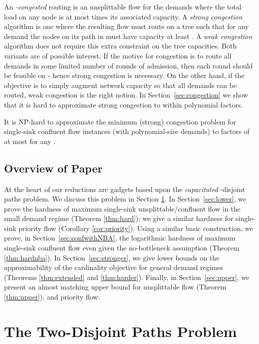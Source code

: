 \documentclass[12pt]{article}
\begin{document}
An  {\em -congested}  routing is an unsplittable flow for the demands where the total load on any node is at most  times its associated capacity.
A {\em strong congestion} algorithm is one where  the resulting flow must route on a tree  such that for  any demand  the nodes on its path in  must have capacity at least . A  {\em weak congestion} algorithm does not require this extra constraint on the tree capacities.
 Both variants are of possible interest. If the motive for congestion is to route all demands in some limited number  of rounds of admission, then each round should be feasible on  - hence strong congestion is necessary.  On the other hand, if the objective is to simply augment network capacity so that all demands can be routed, weak congestion is the right notion.
In Section~\ref{sec:congestion} we show that it is hard to approximate strong congestion to within polynomial factors.
 \begin{thm}
 \label{thm:strongcongestion}
 It is NP-hard to approximate the minimum (strong) congestion problem for single-sink confluent flow instances
 (with polynomial-size demands) to factors of at most  for any .
 \end{thm}




\subsection{Overview of Paper}
At the heart of our reductions are gadgets based upon the {\em capacitated} -disjoint paths problem.
We discuss this problem in Section \ref{sec:two-disjoint-paths}.
In Section~\ref{sec:lower}, we prove the  hardness of maximum single-sink unsplittable/confluent
flow in the small demand regime (Theorem \ref{thm:hard}); we give a similar hardness for single-sink priority flow
(Corollary \ref{cor:priority}).
Using a similar basic construction, we prove, in Section~\ref{sec:confwithNBA}, the logarithmic hardness
of maximum single-sink confluent flow
even given the no-bottleneck assumption (Theorem \ref{thm:hardnba}).
In Section~\ref{sec:stronger}, we give lower bounds
on the approximability of the cardinality objective for general demand
regimes (Theorems \ref{thm:extended} and \ref{thm:harder}).
Finally, in Section~\ref{sec:upper}, we present an almost matching upper bound for unsplittable flow (Theorem \ref{thm:upper}).
and priority flow.


\section{The Two-Disjoint Paths Problem}\label{sec:two-disjoint-paths}
\end{document}
